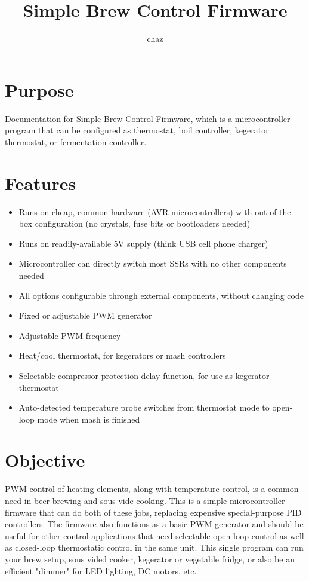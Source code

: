 \documentclass[dvips,12pt]{article}
\title{Simple Brew Control Firmware}
\author{chaz}
\begin{document}
\frenchspacing


\section{Purpose}
Documentation for Simple Brew Control Firmware, which is a microcontroller program that can be configured as thermostat, boil
controller, kegerator thermostat, or fermentation controller. 

\tableofcontents
\listoffigures

\newpage
\section{Features}
\begin{itemize}

\item Runs on cheap, common hardware (AVR microcontrollers) with out-of-the-box configuration
(no crystals, fuse bits or bootloaders needed)
\item Runs on readily-available 5V supply (think USB cell phone charger)
\item Microcontroller can directly switch most SSRs with no other components needed
\item All options configurable through external components, without changing code
\item Fixed or adjustable PWM generator
\item Adjustable PWM frequency 
\item Heat/cool thermostat, for kegerators or mash controllers
\item Selectable compressor protection delay function, for use as kegerator thermostat
\item Auto-detected temperature probe switches from thermostat mode to open-loop mode when mash
is finished


\end{itemize}


\section{Objective}

PWM control of heating elements, along with temperature control, is a common need in beer brewing and sous vide cooking. This is a simple
microcontroller firmware that can do both of these jobs, replacing expensive
special-purpose PID controllers. The firmware also functions as a basic PWM generator and
should be useful for other control applications that need selectable open-loop control as well
as closed-loop thermostatic control in the same unit. This single program can run your brew
setup, sous vided cooker, kegerator or vegetable fridge, or also be an efficient "dimmer" for
LED lighting, DC motors, etc. 
\end{document}
